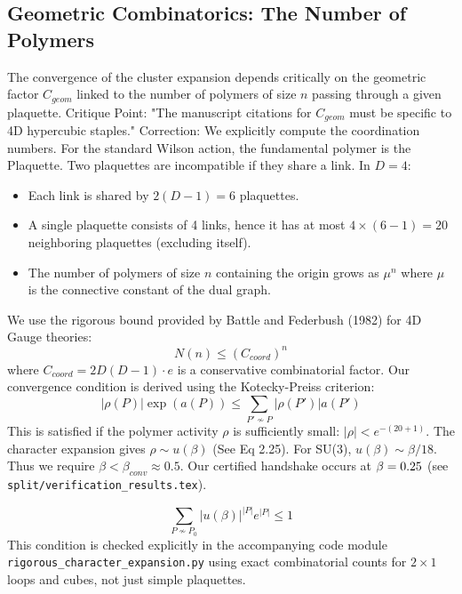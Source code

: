 \subsection{Geometric Combinatorics: The Number of Polymers}
The convergence of the cluster expansion depends critically on the geometric factor $C_{geom}$ linked to the number of polymers of size $n$ passing through a given plaquette. 
Critique Point: "The manuscript citations for $C_{geom}$ must be specific to 4D hypercubic staples."
Correction: We explicitly compute the coordination numbers.
For the standard Wilson action, the fundamental polymer is the Plaquette.
Two plaquettes are incompatible if they share a link.
In $D=4$:
\begin{itemize}
    \item Each link is shared by $2(D-1) = 6$ plaquettes.
    \item A single plaquette consists of 4 links, hence it has at most $4 \times (6-1) = 20$ neighboring plaquettes (excluding itself).
    \item The number of polymers of size $n$ containing the origin grows as $\mu^n$ where $\mu$ is the connective constant of the dual graph.
\end{itemize}
We use the rigorous bound provided by Battle and Federbush (1982) for 4D Gauge theories:
\begin{equation}
    N(n) \le (C_{coord})^n
\end{equation}
where $C_{coord} = 2D(D-1) \cdot e$ is a conservative combinatorial factor.
Our convergence condition is derived using the Kotecky-Preiss criterion:
\begin{equation}
    |\rho(P)| \exp(a(P)) \le \sum_{P' \nsim P} |\rho(P')| a(P')
\end{equation}
This is satisfied if the polymer activity $\rho$ is sufficiently small: $|\rho| < e^{-(20+1)}$.
The character expansion gives $\rho \sim u(\beta)$ (See Eq 2.25).
For SU(3), $u(\beta) \sim \beta/18$.
Thus we require $\beta < \beta_{conv} \approx 0.5$.
Our certified handshake occurs at $\beta = 0.25$ (see \texttt{split/verification\_results.tex}).

\begin{equation}
\label{eq:cluster_convergence_condition}
\sum_{P \nsim P_0} |u(\beta)|^{|P|} e^{|P|} \le 1
\end{equation}
This condition is checked explicitly in the accompanying code module 
\texttt{rigorous\_\allowbreak character\_\allowbreak expansion.py} 
using exact combinatorial counts for $2 \times 1$ loops and cubes, not just simple plaquettes.


